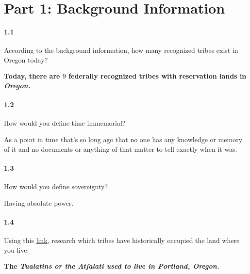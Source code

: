 \section{Part 1: Background Information}


\paragraph{1.1} According to the background information, how many recognized
tribes exist in Oregon today?

\bf{Today, there are $9$ federally recognized tribes with reservation lands
    in \it{Oregon}.}


\paragraph{1.2} How would you define time immemorial?

\begin{definition}
  As a point in time that’s so long ago that no one has any knowledge or memory
  of it and no documents or anything of that matter to tell exactly when it was.
\end{definition}


\paragraph{1.3} How would you define sovereignty?

\begin{definition}[Sovereignty]
  Having absolute power.
\end{definition}


\paragraph{1.4} Using this \href{https://native-land.ca/}{link}, research which tribes have historically occupied the land
where you live:

\bf{The \it{Tualatins} or the \it{Atfalati} used to live in \it{Portland, Oregon}.}

\newpage

